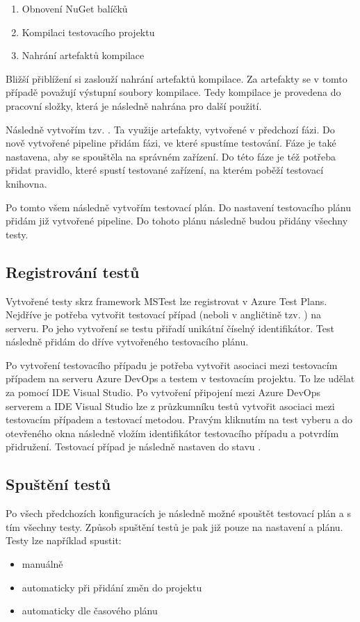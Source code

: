 \begin{enumerate}
    \item Obnovení NuGet balíčků 
    \item Kompilaci testovacího projektu
    \item Nahrání artefaktů kompilace 
\end{enumerate}

Bližší přiblížení si zaslouží nahrání artefaktů kompilace. Za artefakty se v tomto případě považují výstupní soubory kompilace. Tedy kompilace je provedena do pracovní složky, která je následně nahrána pro další použití. 

Následně vytvořím tzv. . Ta využije artefakty, vytvořené v předchozí fázi. Do nově vytvořené pipeline přidám fázi, ve které spustíme testování. Fáze je také nastavena, aby se spouštěla na správném zařízení. Do této fáze je též potřeba přidat pravidlo, které spustí testované zařízení, na kterém poběží testovací knihovna. 

Po tomto všem následně vytvořím testovací plán. Do nastavení testovacího plánu přidám již vytvořené pipeline. Do tohoto plánu následně budou přidány všechny testy. 

\subsection{Registrování testů}
Vytvořené testy skrz framework MSTest lze registrovat v Azure Test Plans. Nejdříve je potřeba vytvořit testovací případ (neboli v angličtině tzv. ) na serveru. Po jeho vytvoření se testu přiřadí unikátní číselný identifikátor. Test následně přidám do dříve vytvořeného testovacího plánu.

Po vytvoření testovacího případu je potřeba vytvořit asociaci mezi testovacím případem na serveru Azure DevOps a testem v testovacím projektu. To lze udělat za pomocí IDE Visual Studio. Po vytvoření připojení mezi Azure DevOps serverem a IDE Visual Studio lze z průzkumníku testů vytvořit asociaci mezi testovacím případem a testovací metodou. Pravým kliknutím na test vyberu  a do otevřeného okna následně vložím identifikátor testovacího případu a potvrdím přidružení. Testovací případ je následně nastaven do stavu .

\subsection{Spuštění testů}
Po všech předchozích konfiguracích je následně možné spouštět testovací plán a s tím všechny testy. Způsob spuštění testů je pak již pouze na nastavení a plánu. Testy lze například spustit:

\begin{itemize}
    \item manuálně
    \item automaticky při přidání změn do projektu
    \item automaticky dle časového plánu
\end{itemize}


